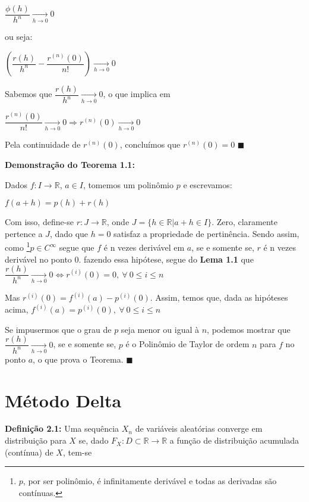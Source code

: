 \documentclass[12pt]{article}
\begin{document}
$\dfrac{\phi(h)}{h^n}\underset{h\to0}{\longrightarrow}0$

ou seja:

$\left(\dfrac{r(h)}{h^n}-\dfrac{r^{(n)}(0)}{n!}\right)\underset{h\to0}{\longrightarrow}0$

Sabemos que $\dfrac{r(h)}{h^n}\underset{h\to0}{\longrightarrow}0$, o que implica em

$\dfrac{r^{(n)}(0)}{n!}\underset{h\to0}{\longrightarrow}0\Rightarrow r^{(n)}(0)\underset{h\to0}{\longrightarrow}0$

Pela continuidade de $r^{(n)}(0)$, concluímos que $r^{(n)}(0)=0$
$\blacksquare$

\textbf{Demonstração do Teorema 1.1: }\cite{lima1981curso}

Dados $f:I\longrightarrow\mathbb{R}$, $a\in I$, tomemos um polinômio $p$ e escrevamos:

$f(a+h)=p(h)+r(h)$

Com isso, define-se $r:J\longrightarrow\mathbb{R}$, onde $J=\{h\in\mathbb{R}|a+h\in I\}$. Zero, claramente pertence a $J$, dado que $h=0$ satisfaz a propriedade de pertinência. Sendo assim, como \footnote{$p$, por ser polinômio, é infinitamente derivável e todas as derivadas são contínuas.}$p\in C^{\infty}$ segue que $f$ é n vezes derivável em $a$, se e somente se, $r$ é n vezes derivável no ponto $0$. fazendo essa hipótese, segue do \textbf{Lema 1.1} que $\dfrac{r(h)}{h^n}\underset{h\to0}{\longrightarrow}0\Longleftrightarrow r^{(i)}(0)=0,
~\forall ~0\leq i\leq n$

Mas $r^{(i)}(0)=f^{(i)}(a)-p^{(i)}(0)$. Assim, temos que, dada as hipóteses acima, $f^{(i)}(a)=p^{(i)}(0),~\forall ~0\leq i\leq n$

Se impusermos que o grau de $p$ seja menor ou igual à $n$, podemos mostrar que $\dfrac{r(h)}{h^n}\underset{h\to0}{\longrightarrow}0$, se e somente se, $p$ é o Polinômio de Taylor de ordem $n$ para $f$ no ponto $a$, o que prova o Teorema. $\blacksquare$



\section{Método Delta}



\textbf{Definição 2.1: }\cite{CaseBerg:01} Uma sequência $X_n$ de variáveis aleatórias converge em distribuição para $X$ se, dado $F_X:D\subset\mathbb{R}\longrightarrow\mathbb{R}$ a função de distribuição acumulada (contínua) de $X$, tem-se
\end{document}

